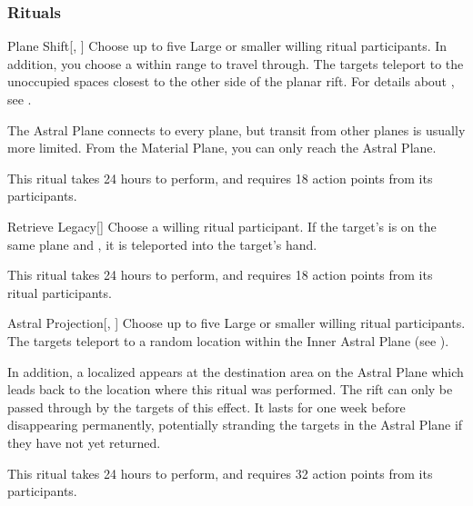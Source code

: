 \subsubsection{Rituals}


\lowercase{\hypertarget{spell:Plane Shift}{}}\label{spell:Plane Shift}
\begin{ability}[\nth{3}]{\hypertarget{spell:Plane Shift}{Plane Shift}}[, ]
Choose up to five Large or smaller willing ritual participants.
In addition, you choose a  within \rngmed range to travel through.
The targets teleport to the unoccupied spaces closest to the other side of the planar rift.
For details about , see .

The Astral Plane connects to every plane, but transit from other planes is usually more limited.
From the Material Plane, you can only reach the Astral Plane.

This ritual takes 24 hours to perform, and requires 18 action points from its participants.
\end{ability}
\vspace{0.25em}



\lowercase{\hypertarget{spell:Retrieve Legacy}{}}\label{spell:Retrieve Legacy}
\begin{ability}[\nth{3}]{\hypertarget{spell:Retrieve Legacy}{Retrieve Legacy}}[]
Choose a willing ritual participant.
If the target's  is on the same plane and , it is teleported into the target's hand.

This ritual takes 24 hours to perform, and requires 18 action points from its ritual participants.
\end{ability}
\vspace{0.25em}



\lowercase{\hypertarget{spell:Astral Projection}{}}\label{spell:Astral Projection}
\begin{ability}[\nth{4}]{\hypertarget{spell:Astral Projection}{Astral Projection}}[, ]
Choose up to five Large or smaller willing ritual participants.
The targets teleport to a random location within the Inner Astral Plane (see ).

In addition, a localized  appears at the destination area on the Astral Plane which leads back to the location where this ritual was performed.
The rift can only be passed through by the targets of this effect.
It lasts for one week before disappearing permanently, potentially stranding the targets in the Astral Plane if they have not yet returned.

This ritual takes 24 hours to perform, and requires 32 action points from its participants.
\end{ability}
\vspace{0.25em}



